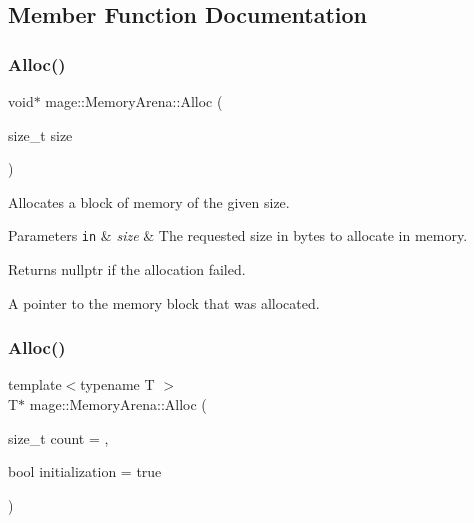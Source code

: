\subsection{Member Function Documentation}
\hypertarget{classmage_1_1_memory_arena_a83f19bd85aea65001e6406075c105398}{}\label{classmage_1_1_memory_arena_a83f19bd85aea65001e6406075c105398} 
\subsubsection{\texorpdfstring{Alloc()}{Alloc()}\hspace{0.1cm}{\footnotesize\ttfamily [1/2]}}
{\footnotesize\ttfamily void$\ast$ mage\+::\+Memory\+Arena\+::\+Alloc (\begin{DoxyParamCaption}\item[{size\+\_\+t}]{size }\end{DoxyParamCaption})}

Allocates a block of memory of the given size.


\begin{DoxyParams}[1]{Parameters}
\mbox{\tt in}  & {\em size} & The requested size in bytes to allocate in memory. \\
\hline
\end{DoxyParams}
\begin{DoxyReturn}{Returns}
{\ttfamily nullptr} if the allocation failed. 

A pointer to the memory block that was allocated. 
\end{DoxyReturn}
\hypertarget{classmage_1_1_memory_arena_ab249fe48cdf7c46f625050fe9583603a}{}\label{classmage_1_1_memory_arena_ab249fe48cdf7c46f625050fe9583603a} 
\subsubsection{\texorpdfstring{Alloc()}{Alloc()}\hspace{0.1cm}{\footnotesize\ttfamily [2/2]}}
{\footnotesize\ttfamily template$<$typename T $>$ \\
T$\ast$ mage\+::\+Memory\+Arena\+::\+Alloc (\begin{DoxyParamCaption}\item[{size\+\_\+t}]{count = {},  }\item[{bool}]{initialization = {\ttfamily true} }\end{DoxyParamCaption})}

